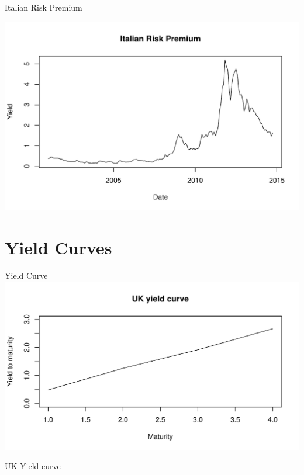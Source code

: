 \documentclass[14pt,xcolor=pdftex,dvipsnames,table]{beamer}\usepackage[]{graphicx}\usepackage[]{color}
\makeatletter
\def\maxwidth{ %
  \ifdim\Gin@nat@width>\linewidth
    \linewidth
  \else
    \Gin@nat@width
  \fi
}
\newenvironment{knitrout}{}{} %
\makeatother
\begin{document}
\begin{frame}{Italian Risk Premium}
\begin{knitrout}
\color{fgcolor}

{\centering \includegraphics[width=\maxwidth]{figure/yield3-1} 

}



\end{knitrout}
\end{frame}


\section{Yield Curves}
\begin{frame}{Yield Curve}
\begin{knitrout}
\color{fgcolor}
\includegraphics[width=\maxwidth]{figure/yc-1} 

\end{knitrout}
\href{http://www.bloomberg.com/markets/rates-bonds/government-bonds/uk/}{UK Yield curve}
\end{frame}
\end{document}
